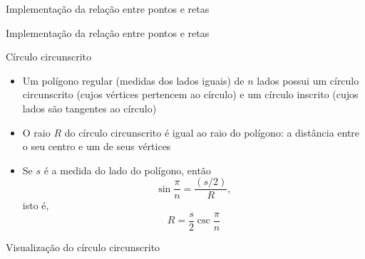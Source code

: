 \begin{frame}[fragile]{Implementação da relação entre pontos e retas}
\end{frame}

\begin{frame}[fragile]{Implementação da relação entre pontos e retas}
\end{frame}

\begin{frame}[fragile]{Círculo circunscrito}

    \begin{itemize}
        \item Um polígono regular (medidas dos lados iguais) de $n$ lados possui um círculo 
            circunscrito (cujos vértices pertencem ao círculo) e um círculo inscrito 
            (cujos lados são tangentes ao círculo)
        \pause

        \item O raio $R$ do círculo circunscrito é igual ao raio do polígono: a distância entre o 
            seu centro e um de seus vértices
        \pause

        \item Se $s$ é a medida do lado do polígono, então
        \[
            \sin \frac{\pi}{n} = \frac{(s/2)}{R},
        \]
        isto é,
        \[
            R = \frac{s}{2}\csc\frac{\pi}{n}
        \]

    \end{itemize}

\end{frame}

\begin{frame}[fragile]{Visualização do círculo circunscrito}

    \def\R{3}

    \begin{figure}
    \end{figure}

\end{frame}

